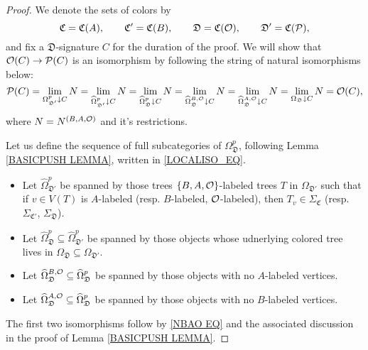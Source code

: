 \documentclass[a4paper,10pt
,draft
]{article}%
\renewcommand{\hat}{\widehat}
\renewcommand{\1}{\eta}%
\begin{document}
\begin{proof}
      We denote the sets of colors by
      \[
            \mathfrak C = \mathfrak C(A),
            \qquad
            \mathfrak C' = \mathfrak C(B),
            \qquad
            \mathfrak D = \mathfrak C(\mathcal{O}),
            \qquad
            \mathfrak D' = \mathfrak C(\mathcal{P}),
      \]
      and fix a $\mathfrak D$-signature $C$ for the duration of the proof.
      We will show that $\mathcal{O}(C) \to \mathcal{P}(C)$ is an isomorphism
      by following the string of natural isomorphisms below:
      \begin{equation}
            \label{LOCALISO_EQ}
            \P(C) =
            \lim_{\Omega_{\mathfrak D'}^p \downarrow C} N =
            \lim_{\hat\Omega_{\mathfrak D'}^p \downarrow C} N =
            \lim_{\hat \Omega_{\mathfrak D}^p \downarrow C} N =
            \lim_{\hat\Omega_{\mathfrak D}^{B, \O} \downarrow C} N = 
            \lim_{\hat\Omega_{\mathfrak D}^{A,\O} \downarrow C} N =
            \lim_{\Omega_{\mathfrak D} \downarrow C} N =
            \O(C),
      \end{equation}
      where $N = N^{(B,A,\mathcal{O})}$ and it's restrictions.
      
      Let us define the sequence of full subcategories of $\Omega_{\mathfrak D}^p$, following Lemma \ref{BASICPUSH LEMMA}, written in \eqref{LOCALISO_EQ}.
      \begin{itemize}
      \item Let $\hat \Omega_{\mathfrak D'}^p$
            be spanned by those trees $\left\{B,A,\mathcal{O}\right\}$-labeled trees $T$ in $\Omega_{\mathfrak D'}$ such that
            if $v \in V(T)$ is $A$-labeled (resp. $B$-labeled, $\mathcal{O}$-labeled), then
            $T_v \in \Sigma_{\mathfrak C}$ (resp. $\Sigma_{\mathfrak C'}$, $\Sigma_{\mathfrak D}$).
      \item Let $\hat \Omega_{\mathfrak D}^p \subseteq \hat \Omega_{\mathfrak D'}^p$ be spanned by those objects whose udnerlying colored tree lives in $\Omega_{\mathfrak D} \subseteq \Omega_{\mathfrak D'}$.
      \item Let $\hat \Omega_{\mathfrak D}^{B,\O} \subseteq \hat \Omega_{\mathfrak D}^p$ be spanned by those objects with no $A$-labeled vertices.
      \item Let $\hat \Omega_{\mathfrak D}^{A,\O} \subseteq \hat \Omega_{\mathfrak D}^p$ be spanned by those objects with no $B$-labeled vertices.
      \end{itemize}

      The first two isomorphisms follow by \eqref{NBAO EQ} and the associated discussion in the proof of Lemma \ref{BASICPUSH LEMMA}.
      

\end{proof}
\end{document}
